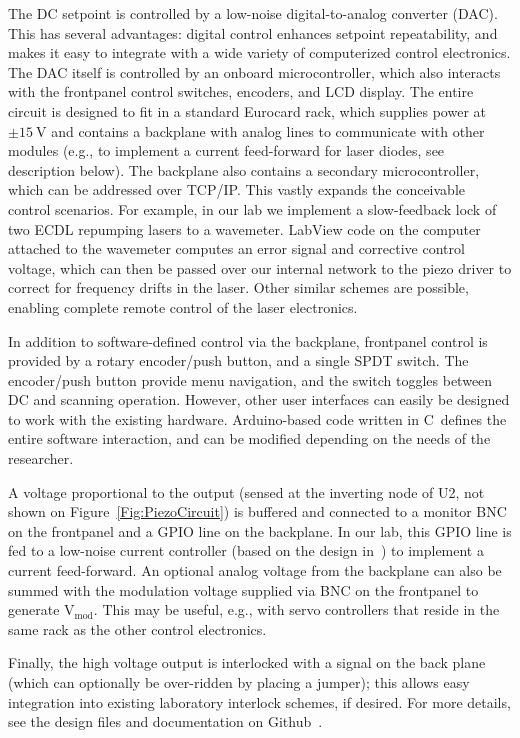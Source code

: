 \documentclass[aip,rsi,reprint]{revtex4-1} %
\newcommand{\CC}{{C\nolinebreak[4]\hspace{-.05em}\raisebox{.4ex}{\tiny\bf ++}}~}
\begin{document}
The DC setpoint is controlled by a low-noise digital-to-analog converter (DAC).
This has several advantages: digital control enhances setpoint repeatability, and makes it easy to integrate with a wide variety of computerized control electronics.
The DAC itself is controlled by an onboard microcontroller, which also interacts with the frontpanel control switches, encoders, and LCD display.
The entire circuit is designed to fit in a standard Eurocard rack, which supplies power at $\pm\SI{15}{\volt}$ and contains a backplane with analog lines to communicate with other modules (e.g., to implement a current feed-forward for laser diodes, see description below).
The backplane also contains a secondary microcontroller, which can be addressed over TCP/IP.
This vastly expands the conceivable control scenarios. For example, in our lab we implement a slow-feedback lock of two ECDL repumping lasers to a wavemeter.
LabView code on the computer attached to the wavemeter computes an error signal and corrective control voltage, which can then be passed over our internal network to the piezo driver to correct for frequency drifts in the laser.
Other similar schemes are possible, enabling complete remote control of the laser electronics.

In addition to software-defined control via the backplane, frontpanel control is provided by a rotary encoder/push button, and a single SPDT switch.
The encoder/push button provide menu navigation, and the switch toggles between DC and scanning operation.
However, other user interfaces can easily be designed to work with the existing hardware.
Arduino-based code written in \CC defines the entire software interaction, and can be modified depending on the needs of the researcher.

A voltage proportional to the output (sensed at the inverting node of U2, not shown on Figure~\ref{Fig:PiezoCircuit}) is buffered and connected to a monitor BNC on the frontpanel and a GPIO line on the backplane.
In our lab, this GPIO line is fed to a low-noise current controller (based on the design in~\cite{Erickson2008a}) to implement a current feed-forward.
An optional analog voltage from the backplane can also be summed with the modulation voltage supplied via BNC on the frontpanel to generate $\text{V}_{\text{mod}}$.
This may be useful, e.g., with servo controllers that reside in the same rack as the other control electronics.

Finally, the high voltage output is interlocked with a signal on the back plane (which can optionally be over-ridden by placing a jumper); this allows easy integration into existing laboratory interlock schemes, if desired.
For more details, see the design files and documentation on Github~\cite{DesignFiles}.
\end{document}
